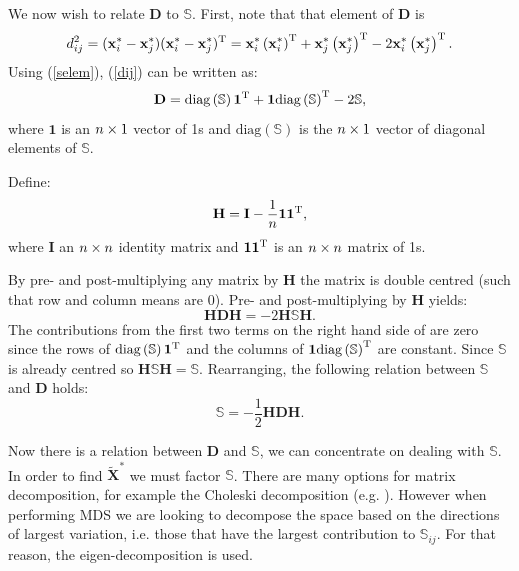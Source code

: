 We now wish to relate $\mathbf{D}$ to $\mathbb{S}$. First, note that that \ijth element of $\mathbf{D}$ is 
\begin{equation}
d_{ij}^2 = (\mathbf{x}^*_i-\mathbf{x}^*_j)(\mathbf{x}^*_i-\mathbf{x}^*_j)^{\text{T}} = \mathbf{x}^*_i \left(\mathbf{x}^*_i\right )^\text{T} + \mathbf{x}^*_j \left ( \mathbf{x}^*_j\right )^\text{T}  -2 \mathbf{x}^*_i \left (\mathbf{x}^*_j\right )^\text{T}.
\label{dij}
\end{equation}
Using (\ref{selem}),  (\ref{dij}) can be written as:
\begin{equation}
\mathbf{D}=\text{diag}\left(\mathbb{S}\right)\bm{1}^{\text{T}} + \bm{1}\text{diag}\left(\mathbb{S}\right)^{\text{T}} -2\mathbb{S},
\label{dijmat}
\end{equation}
where $\bm{1}$ is an $n \times 1$ vector of 1s and $\text{diag}\left(\mathbb{S}\right)$ is the $n \times 1$ vector of diagonal elements of $\mathbb{S}$.

Define:
\begin{equation}
\mathbf{H} = \mathbf{I}-\frac{1}{n}\bm{1}\bm{1}^{\text{T}},
\end{equation}
where $\mathbf{I}$ an $n \times n$ identity matrix and $\bm{1}\bm{1}^{\text{T}}$ is an $n \times n$ matrix of 1s.

By pre- and post-multiplying any matrix by $\mathbf{H}$ the matrix is double centred (such that row and column means are 0). Pre- and post-multiplying  by $\mathbf{H}$ yields:
\begin{equation}
\mathbf{H}\mathbf{D}\mathbf{H} = -2\mathbf{H}\mathbb{S}\mathbf{H}.
\end{equation}
\label{cor-r31-1}The contributions from the first two terms on the right hand side of  are zero since the rows of $\text{diag}\left(\mathbb{S}\right)\bm{1}^{\text{T}}$ and the columns of  $\bm{1}\text{diag}\left(\mathbb{S}\right)^{\text{T}}$ are constant. Since $\mathbb{S}$ is already centred so $\mathbf{H}\mathbb{S}\mathbf{H}=\mathbb{S}$. Rearranging, the following relation between $\mathbb{S}$ and $\mathbf{D}$ holds:
\begin{equation}
\mathbb{S} = -\frac{1}{2}\mathbf{H}\mathbf{D}\mathbf{H}.
\end{equation}

Now there is a relation between $\mathbf{D}$ and $\mathbb{S}$, we can concentrate on dealing with $\mathbb{S}$. In order to find $\tilde{\mathbf{X}}^{*}$ we must factor $\mathbb{S}$. There are many options for matrix decomposition, for example the Choleski decomposition (e.g. \cite[pp. 334-335]{simonbook}). However when performing MDS we are looking to decompose the space based on the directions of largest variation, i.e. those that have the largest contribution to $\mathbb{S}_{ij}$. For that reason, the eigen-decomposition is used.

